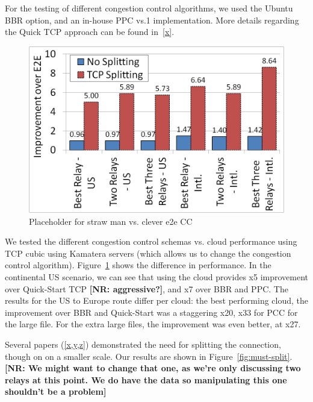 \documentclass[10pt,sigconf]{acmart}
\newcommand{\mycomm}[3]{{\color{#2} \textbf{[#1: #3]}}}
\newcommand{\mycomm}[3]{}
\newcommand{\NR}[1]{\mycomm{NR}{violet}{#1}}
\begin{document}
For the testing of different congestion control algorithms, we used the Ubuntu BBR option, and an in-house PPC vs.1 implementation. More details regarding the Quick TCP approach can be found in~\ref{x}.

\begin{figure}
  \centering
  \includegraphics[width=\columnwidth,trim=2mm 2mm 2mm 2mm,clip]{figures/tcp_splitting_aws.png}
  \caption{Placeholder for straw man vs. clever e2e CC}
 \label{fig:cloud-vs-CC}
\end{figure}

\vspace{0.1in} We tested the different congestion control schemas vs. cloud performance using TCP cubic using Kamatera servers (which allows us to change the congestion control algorithm). Figure~\ref{fig:cloud-vs-CC} shows the difference in performance. 
In the continental US scenario, we can see that using the cloud provides x5 improvement over Quick-Start TCP \NR{aggressive?}, and x7 over BBR and PPC.
The results for the US to Europe route differ per cloud: the best performing cloud, the improvement over BBR and Quick-Start was a staggering x20, x33 for PCC for the large file. For the extra large files, the improvement was even better, at x27.

\vspace{0.1in} Several papers (\ref{x,y,z}) demonstrated the need for splitting the connection, though on on a smaller scale. Our results are shown in Figure~\ref{fig:must-split}. \NR{We might want to change that one, as we're only discussing two relays at this point. We do have the data so manipulating this one shouldn't be a problem}
\end{document}
